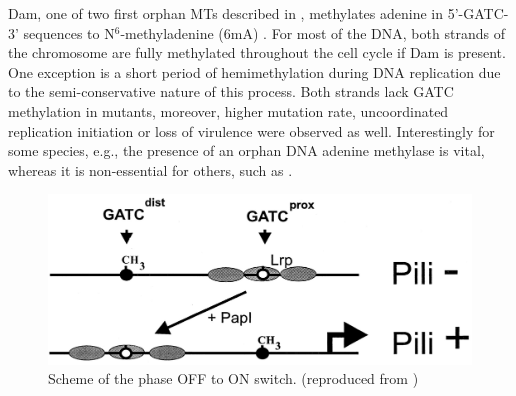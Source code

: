 Dam, one of two first orphan MTs described in , methylates adenine in 5'-GATC-3' sequences to N$^6$-methyladenine (6mA) \cite{marinus1973isolation}.
For most of the DNA, both strands of the chromosome are fully methylated throughout the cell cycle if Dam is present.
One exception is a short period of hemimethylation during DNA replication due to the semi-conservative nature of this process. 
Both strands lack GATC methylation in  mutants, moreover, higher mutation rate, uncoordinated replication initiation or loss of virulence were observed as well.
Interestingly for some species, e.g.,  the presence of an orphan DNA adenine methylase is vital, whereas it is non-essential for others, such as  \cite{casadesus2006epigenetic, casadesus2013programmed, adhikari2016dna}.

\begin{figure}[ht!]
  \centering
  \includegraphics[scale=0.3]{text/Pictures/papPili.png}
    \caption{Scheme of the  phase OFF to ON switch. (reproduced from \cite{low2001roles})}
    \label{pap}
\end{figure}

